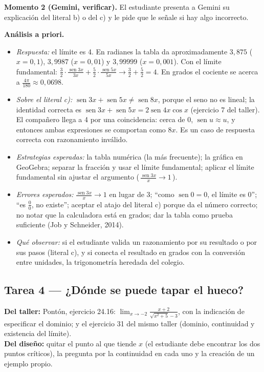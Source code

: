 \documentclass[11pt,letterpaper]{article}
\DeclareMathOperator{\seno}{sen}
\newenvironment{origen}{\par\small\noindent\ignorespaces}{\par\normalsize}
\begin{document}
\textbf{Momento 2 (Gemini, verificar).} El estudiante presenta a Gemini su explicación del literal b) o del c) y le pide que le señale si hay algo incorrecto.

\textbf{Análisis a priori.}
\begin{itemize}
  \item \emph{Respuesta:} el límite es 4. En radianes la tabla da aproximadamente $3{,}875$ ($x=0{,}1$), $3{,}9987$ ($x=0{,}01$) y $3{,}99999$ ($x=0{,}001$). Con el límite fundamental: $\frac32\cdot\frac{\seno 3x}{3x}+\frac52\cdot\frac{\seno 5x}{5x}\to\frac32+\frac52=4$. En grados el cociente se acerca a $\frac{4\pi}{180}\approx0{,}0698$.
  \item \emph{Sobre el literal c):} $\seno 3x+\seno 5x\neq\seno 8x$, porque el seno no es lineal; la identidad correcta es $\seno 3x+\seno 5x=2\seno 4x\cos x$ (ejercicio 7 del taller). El compañero llega a 4 por una coincidencia: cerca de 0, $\seno u\approx u$, y entonces ambas expresiones se comportan como $8x$. Es un caso de respuesta correcta con razonamiento inválido.
  \item \emph{Estrategias esperadas:} la tabla numérica (la más frecuente); la gráfica en GeoGebra; separar la fracción y usar el límite fundamental; aplicar el límite fundamental sin ajustar el argumento (\,$\frac{\seno 3x}{x}\to1$\,).
  \item \emph{Errores esperados:} $\frac{\seno 3x}{x}\to1$ en lugar de 3; ``como $\seno 0=0$, el límite es 0''; ``es $\frac00$, no existe''; aceptar el atajo del literal c) porque da el número correcto; no notar que la calculadora está en grados; dar la tabla como prueba suficiente (Job y Schneider, 2014).
  \item \emph{Qué observar:} si el estudiante valida un razonamiento por su resultado o por sus pasos (literal c), y si conecta el resultado en grados con la conversión entre unidades, la trigonometría heredada del colegio.
\end{itemize}

\subsection*{Tarea 4 --- ¿Dónde se puede tapar el hueco?}

\begin{origen}
\textbf{Del taller:} Pontón, ejercicio 24.16: $\lim_{x\to-2}\frac{x+2}{\sqrt{x^2+5}-3}$, con la indicación de especificar el dominio; y el ejercicio 31 del mismo taller (dominio, continuidad y existencia del límite).\\
\textbf{Del diseño:} quitar el punto al que tiende $x$ (el estudiante debe encontrar los dos puntos críticos), la pregunta por la continuidad en cada uno y la creación de un ejemplo propio.
\end{origen}
\end{document}

